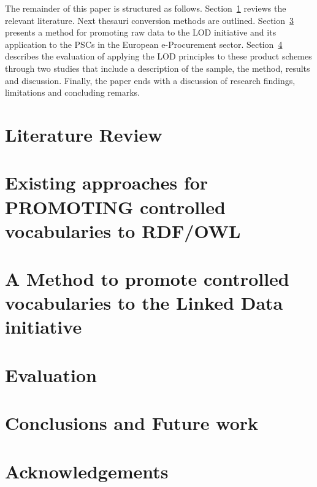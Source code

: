 \documentclass[preprint,12pt]{elsarticle}
\begin{document}
The remainder of this paper is structured as follows. Section~\ref{sect:related-work} reviews the relevant literature. Next thesauri 
conversion methods are outlined. Section~\ref{sect:method} presents a method for promoting raw data to the LOD initiative 
and its application to the PSCs in the European e-Procurement sector. Section~\ref{sect:evaluation} describes the evaluation of applying the LOD principles to 
these product schemes through two studies that include a description of the sample, the method, results and discussion. Finally, 
the paper ends with a discussion of research findings, limitations and concluding remarks.

\section{Literature Review}\label{sect:related-work}
\section{Existing approaches for PROMOTING controlled vocabularies to RDF/OWL}\label{sect:thesauri}
\section{A Method to promote controlled vocabularies to the Linked Data initiative}\label{sect:method}
\section{Evaluation}\label{sect:evaluation}
\section{Conclusions and Future work}\label{sect:conclusions}
\section{Acknowledgements}

\clearpage



\end{document}

